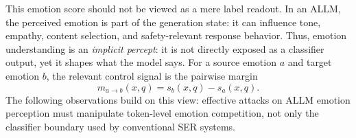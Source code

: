 This emotion score should not be viewed as a mere label readout.
In an ALLM, the perceived emotion is part of the generation state: it can influence tone, empathy, content selection, and safety-relevant response behavior.
Thus, emotion understanding is an \emph{implicit percept}: it is not directly exposed as a classifier output, yet it shapes what the model says.
For a source emotion $a$ and target emotion $b$, the relevant control signal is the pairwise margin
\begin{equation}
    m_{a\rightarrow b}(x,q)=s_b(x,q)-s_a(x,q).
\end{equation}
The following observations build on this view: effective attacks on ALLM emotion perception must manipulate token-level emotion competition, not only the classifier boundary used by conventional SER systems.
